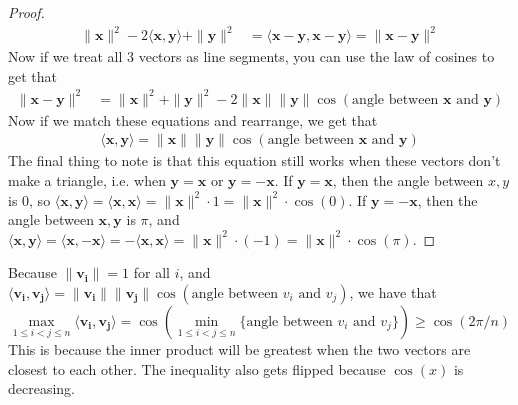 \documentclass[12pt]{article}
\newcommand{\ip}[2]{\langle \mathbf{#1}, \mathbf{#2} \rangle}
\newcommand{\mg}[1]{\| \mathbf{#1} \|}
\begin{document}
\begin{enumerate}[leftmargin=\labelsep]
\begin{proof}
\begin{align*}
			\mg{x}^2-2\ip{x}{y}+\mg{y}^2 &= \ip{x-y}{x-y} = \mg{x-y}^2 
		\end{align*}
		Now if we treat all 3 vectors as line segments, you can use the law of cosines to get that
		\begin{align*}
			\mg{x-y}^2 &= \mg{x}^2+\mg{y}^2-2\mg{x}\mg{y}\cos(\text{angle between $\mathbf{x}$ and $\mathbf{y}$})
		\end{align*}
		Now if we match these equations and rearrange, we get that
		\begin{align*}
			\ip{x}{y} = \mg{x}\mg{y}\cos(\text{angle between $\mathbf{x}$ and $\mathbf{y}$})
		\end{align*}
		The final thing to note is that this equation still works when these vectors don't make a triangle, i.e. when $\mathbf{y=x}$ or $\mathbf{y=-x}$. If $\mathbf{y=x}$, then the angle between $x, y$ is 0, so $\ip{x}{y}=\ip{x}{x}=\mg{x}^2\cdot 1 = \mg{x}^2 \cdot \cos(0)$. If $\mathbf{y=-x}$, then the angle between $\mathbf{x,y}$ is $\pi$, and $\ip{x}{y}=\ip{x}{-x}=-\ip{x}{x}=\mg{x}^2\cdot (-1) = \mg{x}^2 \cdot \cos(\pi)$.
	\end{proof}
	Because $\mg{v_i} = 1$ for all $i$, and $\ip{v_i}{v_j} = \mg{v_i}\mg{v_j}\cos(\text{angle between $v_i$ and $v_j$})$, we have that
	$$\max_{1\leq i < j \leq n}{\ip{v_i}{v_j}} = \cos(\min_{1\leq i < j \leq n}{\text{\{angle between $v_i$ and $v_j$\}}}) \geq \cos(2\pi/n)$$
	This is because the inner product will be greatest when the two vectors are closest to each other. The inequality also gets flipped because $\cos(x)$ is decreasing.
	

\end{enumerate}
\end{document}
